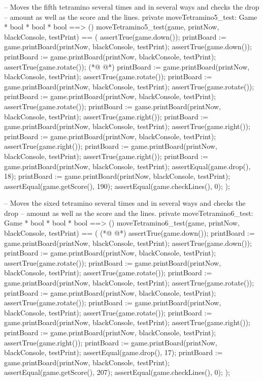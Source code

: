 \begin{vdmpp}[breaklines=true]
  -- Moves the fifth tetramino several times and in several ways and checks the drop
  -- amount as well as the score and the lines.
  private moveTetramino5_test: Game * bool * bool * bool ==> ()
  moveTetramino5_test(game, printNow, blackConsole, testPrint) == (
   assertTrue(game.down());
   printBoard := game.printBoard(printNow, blackConsole, testPrint);
   assertTrue(game.down());
   printBoard := game.printBoard(printNow, blackConsole, testPrint);
   assertTrue(game.rotate());
(*@
\label{moveTetramino6:test:401}
@*)
   printBoard := game.printBoard(printNow, blackConsole, testPrint);
   assertTrue(game.rotate());
   printBoard := game.printBoard(printNow, blackConsole, testPrint);
   assertTrue(game.rotate());
   printBoard := game.printBoard(printNow, blackConsole, testPrint);
   assertTrue(game.rotate());
   printBoard := game.printBoard(printNow, blackConsole, testPrint);
   assertTrue(game.right());
   printBoard := game.printBoard(printNow, blackConsole, testPrint);
   assertTrue(game.right());
   printBoard := game.printBoard(printNow, blackConsole, testPrint);
   assertTrue(game.right());
   printBoard := game.printBoard(printNow, blackConsole, testPrint);
   assertTrue(game.right());
   printBoard := game.printBoard(printNow, blackConsole, testPrint);
   assertEqual(game.drop(), 18);
   printBoard := game.printBoard(printNow, blackConsole, testPrint);
   assertEqual(game.getScore(), 190);
   assertEqual(game.checkLines(), 0);
  );
  
  -- Moves the sixed tetramino several times and in several ways and checks the drop
  -- amount as well as the score and the lines.
  private moveTetramino6_test: Game * bool * bool * bool ==> ()
  moveTetramino6_test(game, printNow, blackConsole, testPrint) == (
(*@
\label{moveTetramino7:test:426}
@*)
   assertTrue(game.down());
   printBoard := game.printBoard(printNow, blackConsole, testPrint);
   assertTrue(game.down());
   printBoard := game.printBoard(printNow, blackConsole, testPrint);
   assertTrue(game.rotate());
   printBoard := game.printBoard(printNow, blackConsole, testPrint);
   assertTrue(game.rotate());
   printBoard := game.printBoard(printNow, blackConsole, testPrint);
   assertTrue(game.rotate());
   printBoard := game.printBoard(printNow, blackConsole, testPrint);
   assertTrue(game.rotate());
   printBoard := game.printBoard(printNow, blackConsole, testPrint);
   assertTrue(game.rotate());
   printBoard := game.printBoard(printNow, blackConsole, testPrint);
   assertTrue(game.right());
   printBoard := game.printBoard(printNow, blackConsole, testPrint);
   assertTrue(game.right());
   printBoard := game.printBoard(printNow, blackConsole, testPrint);
   assertEqual(game.drop(), 17);
   printBoard := game.printBoard(printNow, blackConsole, testPrint);
   assertEqual(game.getScore(), 207);
   assertEqual(game.checkLines(), 0);
  );
  

\end{vdmpp}
